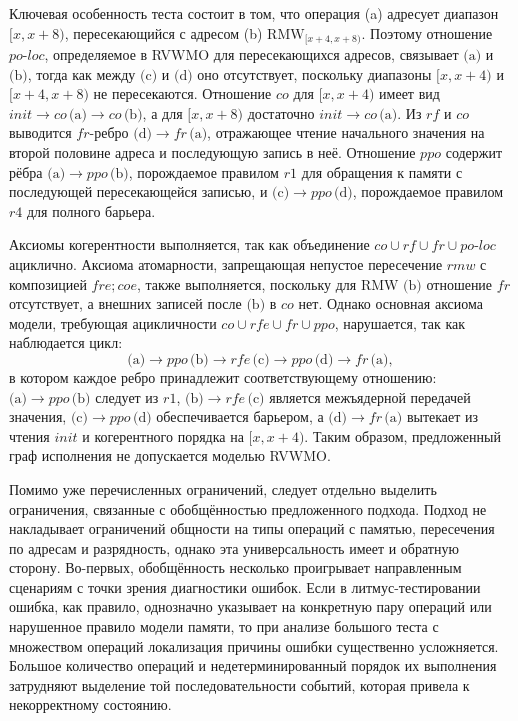 Ключевая особенность теста состоит в том, что операция (a)
адресует диапазон $[x,x+8)$, пересекающийся с адресом (b)
$\text{RMW}_{[x+4,x+8)}$. Поэтому отношение \(po\text{-}loc\),
определяемое в RVWMO для пересекающихся адресов, связывает \(\text{(a)}\) и
\(\text{(b)}\), тогда как между \(\text{(c)}\) и \(\text{(d)}\) оно
отсутствует, поскольку
диапазоны \([x,x+4)\) и \([x+4,x+8)\) не пересекаются. Отношение \(co\)
для \([x,x+4)\) имеет вид \(init\to co\,\text{(a)}\to co\,\text{(b)}\), а для
\([x,x+8)\) достаточно \(init\to co\,\text{(a)}\). Из \(rf\) и \(co\)
выводится \(fr\)-ребро \(\text{(d)}\to fr\,\text{(a)}\), отражающее чтение
начального значения на второй половине адреса и последующую запись в
неё. Отношение \(ppo\) содержит рёбра \(\text{(a)}\to ppo\,\text{(b)}\),
порождаемое правилом \(r1\) для обращения к памяти с последующей
пересекающейся записью, и \(\text{(c)}\to ppo\,\text{(d)}\),
порождаемое правилом
\(r4\) для полного барьера.

Аксиомы когерентности выполняется, так как объединение
\(co\cup rf\cup fr\cup po\text{-}loc\) ациклично.
Аксиома атомарности, запрещающая
непустое пересечение \(rmw\) с композицией \(fre;coe\), также
выполняется, поскольку для RMW \(\text{(b)}\) отношение \(fr\) отсутствует,
а внешних записей после \(\text{(b)}\) в \(co\) нет. Однако основная аксиома
модели, требующая ацикличности \(co\cup rfe\cup fr\cup ppo\),
нарушается, так как наблюдается цикл:
\[
  \text{(a)}\to ppo\,\text{(b)}\to rfe\,\text{(c)}\to
  ppo\,\text{(d)}\to fr\,\text{(a)},
\]
в котором каждое ребро принадлежит соответствующему отношению:
\(\text{(a)}\to ppo\,\text{(b)}\) следует из \(r1\), \(\text{(b)}\to
rfe\,\text{(c)}\) является
межъядерной передачей значения, \(\text{(c)}\to ppo\,\text{(d)}\) обеспечивается
барьером, а \(\text{(d)}\to fr\,\text{(a)}\) вытекает из чтения \(init\) и
когерентного порядка на \([x,x+4)\).
Таким образом, предложенный граф исполнения не допускается моделью
RVWMO.

Помимо уже перечисленных ограничений, следует отдельно выделить
ограничения, связанные с обобщённостью предложенного подхода. Подход
не накладывает ограничений общности на типы операций с памятью,
пересечения по адресам и разрядность, однако эта универсальность
имеет и обратную сторону.
Во-первых, обобщённость несколько проигрывает направленным сценариям
с точки зрения диагностики ошибок. Если в литмус-тестировании ошибка,
как правило, однозначно указывает на конкретную пару операций или
нарушенное правило модели памяти, то при анализе большого теста с
множеством операций локализация причины ошибки существенно
усложняется. Большое количество операций и недетерминированный
порядок их выполнения затрудняют выделение той последовательности
событий, которая привела к некорректному состоянию.


